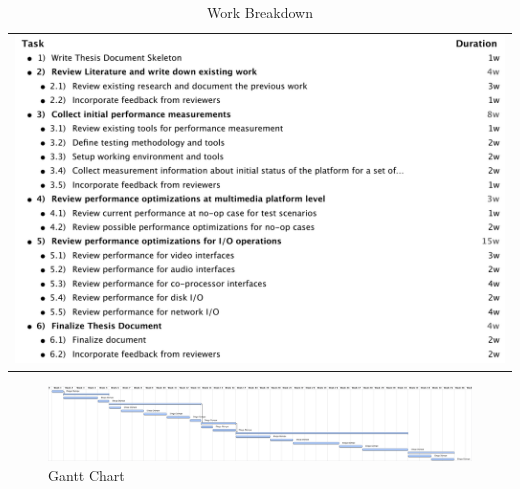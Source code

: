\begin{table}[tph]
\caption{Work Breakdown} \centering
\begin{tabular}{c}
\includegraphics[width=1.0\textwidth]{images/Outline.pdf}
\end{tabular}
\end{table}

\begin{figure}[tbh]
\centering
\includegraphics[width=0.85\textheight,angle=90]{images/Gantt.pdf}
\caption{Gantt Chart}\label{gantt}
\end{figure}

